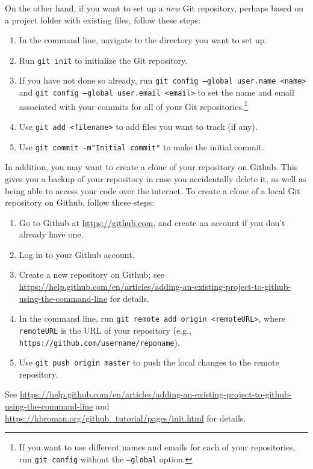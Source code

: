 \documentclass[12pt]{article}
\begin{document}
On the other hand, if you want to set up a \emph{new} Git repository, perhaps based on a project folder with existing files, follow these steps:
\begin{enumerate}
    \item In the command line, navigate to the directory you want to set up.
    \item Run \texttt{git init} to initialize the Git repository.
    \item If you have not done so already, run \texttt{git config --global user.name <name>} and \texttt{git config --global user.email <email>} to set the name and email associated with your commits for all of your Git repositories.\footnote{If you want to use different names and emails for each of your repositories, run \texttt{git config} without the \texttt{--global} option.}
    \item Use \texttt{git add <filename>} to add files you want to track (if any).
    \item Use \texttt{git commit -m"Initial commit"} to make the initial commit.
\end{enumerate}
In addition, you may want to create a clone of your repository on Github. This gives you a backup of your repository in case you accidentally delete it, as well as being able to access your code over the internet. To create a clone of a local Git repository on Github, follow these steps:
\begin{enumerate}
    \item Go to Github at \url{https://github.com}, and create an account if you don't already have one.
    \item Log in to your Github account.
    \item Create a new repository on Github; see \url{https://help.github.com/en/articles/adding-an-existing-project-to-github-using-the-command-line} for details.
    \item In the command line, run \texttt{git remote add origin <remoteURL>}, where \texttt{remoteURL} is the URL of your repository (e.g., \nolinkurl{https://github.com/username/reponame}).
    \item Use \texttt{git push origin master} to push the local changes to the remote repository.
\end{enumerate}
See \url{https://help.github.com/en/articles/adding-an-existing-project-to-github-using-the-command-line} and \url{https://kbroman.org/github_tutorial/pages/init.html} for details.
\end{document}

